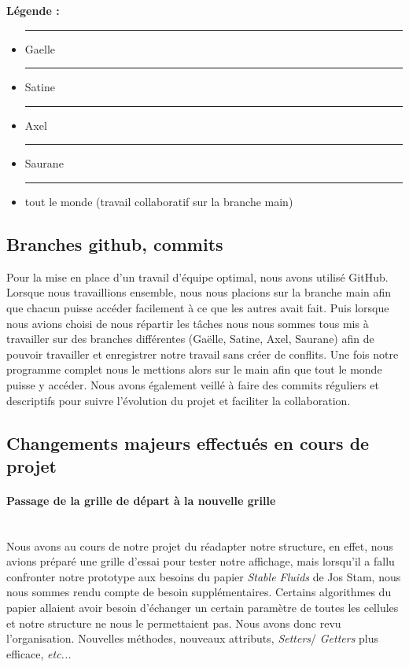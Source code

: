 \documentclass[a4paper]{article}
\begin{document}
\vspace{1cm}
\textbf{Légende :}
\begin{itemize}
  \item \textcolor{ForestGreen}{\rule{0.5cm}{0.3cm}} Gaelle
  \item \textcolor{WildStrawberry}{\rule{0.5cm}{0.3cm}} Satine
  \item \textcolor{Blue}{\rule{0.5cm}{0.3cm}} Axel
  \item \textcolor{BrickRed}{\rule{0.5cm}{0.3cm}} Saurane
  \item \textcolor{Cyan}{\rule{0.5cm}{0.3cm}} tout le monde (travail collaboratif sur la branche main)
\end{itemize}

\subsection{Branches github, commits}


\hspace*{\parindent} Pour la mise en place d'un travail d'équipe optimal, nous avons utilisé GitHub.
 Lorsque nous travaillions ensemble, nous nous placions sur la branche main afin que chacun puisse accéder facilement
  à ce que les autres avait fait. Puis lorsque nous avions choisi de nous répartir les tâches nous nous
   sommes tous mis à travailler sur des branches différentes (Gaëlle, Satine, Axel, Saurane) afin de pouvoir 
   travailler et enregistrer notre travail sans créer de conflits. Une fois notre programme complet nous 
   le mettions alors sur le main afin 
   que tout le monde puisse y accéder. Nous avons également veillé à faire des commits réguliers et 
   descriptifs pour suivre l'évolution du projet et faciliter la collaboration.



\subsection{Changements majeurs effectués en cours de projet}


\paragraph{Passage de la grille de départ à la nouvelle grille} 
\leavevmode\\


Nous avons au cours de notre projet du réadapter notre structure, en effet, nous avions préparé une grille d'essai pour tester notre affichage, mais lorsqu'il a fallu confronter notre prototype aux besoins du papier \emph{Stable Fluids} de Jos Stam, nous nous sommes rendu compte de besoin supplémentaires. Certains algorithmes du papier allaient avoir besoin d'échanger un certain paramètre de toutes les cellules  et notre structure ne nous le permettaient pas. Nous avons donc revu l'organisation. Nouvelles méthodes, nouveaux attributs, \emph{Setters}/  \emph{Getters} plus efficace, \emph{etc...} 
\end{document}
